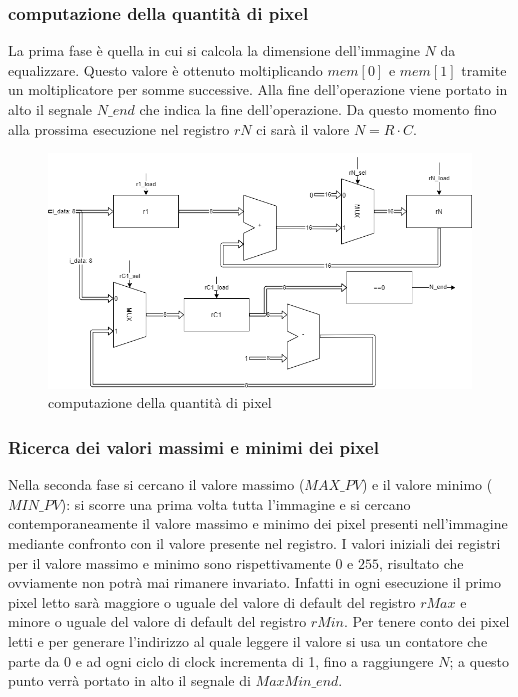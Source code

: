 \documentclass[11pt]{article} %
\begin{document}
\subsubsection{computazione della quantità di pixel}
La prima fase è quella in cui si calcola la dimensione dell'immagine $N$ da equalizzare. Questo valore è ottenuto moltiplicando $mem[0]$ e $mem[1]$ tramite un moltiplicatore per somme successive. Alla fine dell'operazione viene portato in alto il segnale $N\_end$ che indica la fine dell'operazione. Da questo momento fino alla prossima esecuzione nel registro $rN$ ci sarà il valore $N = R \cdot C$.

\begin{figure}[h]
\centering
\includegraphics[width=120mm]{datapaths/regN.png}
\caption{computazione della quantità di pixel}
\end{figure}


\subsubsection{Ricerca dei valori massimi e minimi dei pixel}
Nella seconda fase si cercano il valore massimo ($MAX\_PV$) e il valore minimo ($MIN\_PV$): si scorre una prima volta tutta l'immagine e si cercano contemporaneamente il valore massimo e minimo dei pixel presenti nell'immagine mediante confronto con il valore presente nel registro. I valori iniziali dei registri per il valore massimo e minimo sono rispettivamente $0$ e $255$, risultato che ovviamente non potrà mai rimanere invariato. Infatti in ogni esecuzione il primo pixel letto sarà maggiore o uguale del valore di default del registro $rMax$ e minore o uguale del valore di default del registro $rMin$. Per tenere conto dei pixel letti e per generare l'indirizzo al quale leggere il valore si usa un contatore che parte da 0 e ad ogni ciclo di clock incrementa di 1, fino a raggiungere $N$; a questo punto verrà portato in alto il segnale di $MaxMin\_end$.
\end{document}
